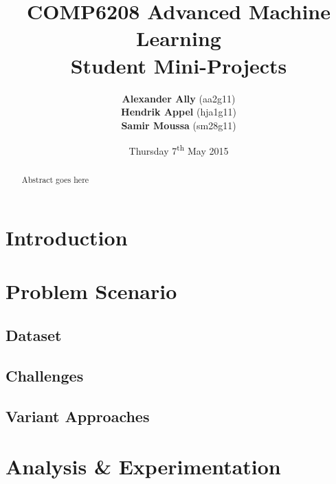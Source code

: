 \documentclass[a4paper, 11pt, twocolumn]{report}
\begin{document}
\lstset{language=Matlab, basicstyle=\small}
\title{\textbf{COMP6208 Advanced Machine Learning} \\
{\Large Student Mini-Projects}}

\author{\textbf{Alexander Ally} (aa2g11)\\
\textbf{Hendrik Appel} (hja1g11)\\
\textbf{Samir Moussa} (sm28g11)}

\date{Thursday 7\textsuperscript{th} May 2015}
\maketitle

\begin{abstract}
Abstract goes here
\end{abstract}

\section{Introduction}




\section{Problem Scenario}

\subsection{Dataset}

\subsection{Challenges}

\subsection{Variant Approaches}






\section{Analysis \& Experimentation}
\end{document}
